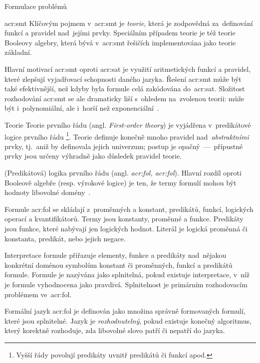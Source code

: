 \documentclass[thesis=M,czech]{FITthesis}[2012/06/26]
\newcommand{\acrlabel}[1]{acr:#1}
\newcommand{\acr}[1]{\acrshort{\acrlabel{#1}}}
\newcommand{\acrl}[1]{\acrlong{\acrlabel{#1}}}
\newcommand{\acrf}[1]{\acrfull{\acrlabel{#1}}}
\newcommand{\acrfc}[1]{\acrl{#1}, \acr{#1}}
\newcommand{\hl}[1]{\textit{#1}}
\newcommand{\name}[1]{\hl{#1}}
\newcommand{\cit}[1]{\cite{#1}}
\begin{document}
\begin{section}{Formulace problémů}
\begin{subsection}{\acrf{smt}}
Klíčovým pojmem v~\acr{smt} je \name{teorie},
která je zodpovědná za~definování
funkcí a pravidel nad~jejími prvky.
Speciálním případem teorie je
též teorie Booleovy algebry,
která bývá v~\acr{smt} řešičích
implementována jako teorie základní.

Hlavní motivací \acr{smt} oproti \acr{sat}
je využití aritmetických funkcí a pravidel,
které zlepšují vyjadřovací schopnosti daného jazyka.
Řešení \acr{smt} může být také efektivnější,
než kdyby byla formule celá zakódována do~\acr{sat}.
Složitost rozhodování \acr{smt} se ale dramaticky liší
s~ohledem na~zvolenou teorii: může být i~polynomiální,
ale i~horší než exponenciální~\cit{theories-book}.


\begin{subsubsection}{Teorie}\label{p:theory:formulation:smt:theory}
Teorie prvního řádu (angl. \name{First-order theory})
je vyjádřena v~predikátové logice prvního řádu%
\footnote{Vyšší řády povolují predikáty uvnitř predikátů či funkcí apod.}.
Teorie definuje konečně mnoho pravidel
nad~\hl{abstraktními} prvky,
tj.~aniž by definovala jejich univerzum;
postup je opačný~---~přípustné prvky
jsou určeny výhradně jako důsledek pravidel teorie.


\begin{paragraph}{(Predikátová) logika prvního řádu}
\label{p:theory:formulation:smt:theory:fol}
(angl. \name{\acrfc{fol}}).
Hlavní rozdíl oproti Booleově algebře
(resp. výrokové logice)
je ten, že termy formulí mohou být hodnoty
libovolné domény~\cit{theories-book}.

Formule \acr{fol} se skládají
z~proměnných a konstant, predikátů, funkcí,
logických operací a kvantifikátorů.
Termy jsou konstanty, proměnné a funkce.
Predikáty jsou funkce,
které nabývají jen logických hodnot.
Literál je logická proměnná či konstanta,
predikát, nebo jejich negace.

Interpretace formule přiřazuje
elementy, funkce a predikáty nad~nějakou konkrétní doménou
symbolům konstant či proměnných, funkcí a predikátů formule.
Formule je nazývána jako splnitelná,
pokud existuje interpretace,
v~níž je formule vyhodnocena jako pravdivá.
Splnitelnost je primárním rozhodovacím problémem ve~\acr{fol}.

Formální jazyk \acr{fol} je definován jako množina
správně formovaných formulí,
které jsou splnitelné.
Jazyk je \name{rozhodnutelný},
pokud existuje konečný algoritmus,
který korektně rozhoduje,
zda libovolné slovo patří či nepatří do jazyka.
\end{paragraph} %


\end{subsubsection}
\end{subsection}
\end{section}
\end{document}
